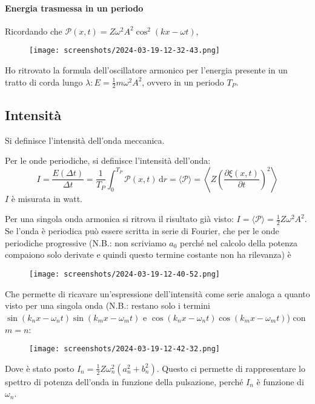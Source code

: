 \paragraph{Energia trasmessa in un periodo}
Ricordando che \(\mathcal{P} (x,t) = Z \omega ^{2} A ^{2} \cos ^{2} (kx-\omega t)\),
\begin{figure}[H]
	\centering
	\texttt{[image: screenshots/2024-03-19-12-32-43.png]}
\end{figure}
Ho ritrovato la formula dell'oscillatore armonico per l'energia presente in un tratto di corda lungo \(\lambda: E = \frac{1}{2}m \omega ^{2} A^{2}  \), ovvero in un periodo \(T_P\).

\subsection{Intensità}

Si definisce l'intensità dell'onda meccanica.

\begin{definition}
	[Intensità]
	Per le onde periodiche, si definisce l'intensità dell'onda:
	\[
		I = \frac{E(\Delta t)}{\Delta t} = \frac{1}{T_P}\int_{0}^{T_P} \mathcal{P} (x,t) \,\mathrm{d}r = \langle \mathcal{P}  \rangle = \left\langle Z \left( \frac{\partial \xi (x,t)}{\partial t} \right)^{2}   \right\rangle 
	\]
	\(I\) è misurata in watt.
\end{definition}

Per una singola onda armonica si ritrova il risultato già visto: \(I = \langle \mathcal{P}  \rangle = \frac{1}{2}Z \omega ^{2} A ^{2} \). Se l'onda è periodica può essere scritta in serie di Fourier, che per le onde periodiche progressive (N.B.: non scriviamo \(a_0\) perché nel calcolo della potenza compaiono solo derivate e quindi questo termine costante non ha rilevanza) è
\begin{figure}[H]
	\centering
	\texttt{[image: screenshots/2024-03-19-12-40-52.png]}
\end{figure}
Che permette di ricavare un'espressione dell'intensità come serie analoga a quanto visto per una singola onda (N.B.: restano solo i termini \(\sin (k_n x- \omega _n t) \sin (k_m x- \omega _m t)\) e \(\cos (k_n x- \omega _n t) \cos (k_m x- \omega _m t)\)) con \(m=n\):
\begin{figure}[H]
	\centering
	\texttt{[image: screenshots/2024-03-19-12-42-32.png]}
\end{figure}
Dove è stato posto \(I_n = \frac{1}{2} Z \omega ^{2} _n (a^{2} _n + b ^{2} _n )\). Questo ci permette di rappresentare lo spettro di potenza dell'onda in funzione della pulsazione, perché \(I_n\) è funzione di \(\omega _n\).

